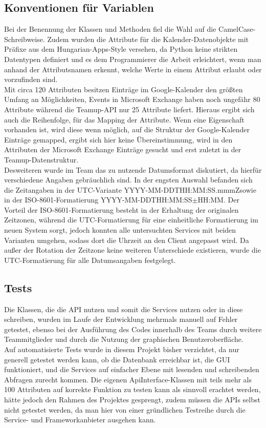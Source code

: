 \subsection{Konventionen für Variablen}
Bei der Benennung der Klassen und Methoden fiel die Wahl auf die CamelCase-Schreibweise. Zudem wurden die Attribute für die Kalender-Datenobjekte mit Präfixe aus dem Hungarian-Apps-Style versehen, da Python keine strikten Datentypen definiert und es dem Programmierer die Arbeit erleichtert, wenn man anhand der Attributsnamen erkennt, welche Werte in einem Attribut erlaubt oder vorzufinden sind.\\
Mit circa 120 Attributen besitzen Einträge im Google-Kalender den größten Umfang an Möglichkeiten, Events in Microsoft Exchange haben noch ungefähr 80 Attribute während die Teamup-API nur 25 Attribute liefert. Hieraus ergibt sich auch die Reihenfolge, für das Mapping der Attribute. Wenn eine Eigenschaft vorhanden ist, wird diese wenn möglich, auf die Struktur der Google-Kalender Einträge gemapped, ergibt sich hier keine Übereinstimmung, wird in den Attributen der Microsoft Exchange Einträge gesucht und erst zuletzt in der Teamup-Datenstruktur. \\
Desweiteren wurde im Team das zu nutzende Datumsformat diskutiert, da hierfür verschiedene Angaben gebräuchlich sind. In der engsten Auswahl befanden sich die Zeitangaben in der UTC-Variante \glqq YYYY-MM-DDTHH:MM:SS.mmmZ\grqq sowie in der ISO-8601-Formatierung \glqq YYYY-MM-DDTHH:MM:SS$\pm$HH:MM\grqq. Der Vorteil der ISO-8601-Formatierung besteht in der Erhaltung der originalen Zeitzonen, während die UTC-Formatierung für eine einheitliche Formatierung im neuen System sorgt, jedoch konnten alle untersuchten Services mit beiden Varianten umgehen, sodass dort die Uhrzeit an den Client angepasst wird. Da außer der Rotation der Zeitzone keine weiteren Unterschiede existieren, wurde die UTC-Formatierung für alle Datumsangaben festgelegt.

\subsection{Tests}
Die Klassen, die die API nutzen und somit die Services nutzen oder in diese schreiben, wurden im Laufe der Entwicklung mehrmals manuell auf Fehler getestet, ebenso bei der Ausführung des Codes innerhalb des Teams durch weitere Teammitglieder und durch die Nutzung der graphischen Benutzeroberfläche.\\
Auf automatisierte Tests wurde in diesem Projekt bisher verzichtet, da nur generell getestet werden kann, ob die Datenbank erreichbar ist, die GUI funktioniert, und die Services auf einfacher Ebene mit lesenden und schreibenden Abfragen zurecht kommen. Die eigenen ApiInterface-Klassen mit teils mehr als 100 Attributen auf korrekte Funktion zu testen kann als sinnvoll erachtet werden, hätte jedoch den Rahmen des Projektes gesprengt, zudem müssen die APIs selbst nicht getestet werden, da man hier von einer gründlichen Testreihe durch die Service- und Frameworkanbieter ausgehen kann. \\